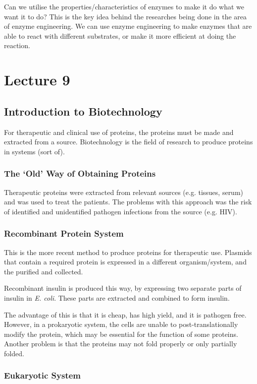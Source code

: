\documentclass[a4paper, 12pt]{report}
\newcommand{\mychapter}[2]{
    \setcounter{chapter}{#1}
    \setcounter{section}{0}
    \chapter*{#2}
    \addcontentsline{toc}{chapter}{#2}
}
\begin{document}
Can we utilise the properties/characteristics of enzymes to make it do what we want it to do?
This is the key idea behind the researches being done in the area of enzyme engineering.
We can use enzyme engineering to make enzymes that are able to react with different substrates, or make it more efficient at doing the reaction.

\mychapter{9}{Lecture 9}

\section{Introduction to Biotechnology}

For therapeutic and clinical use of proteins, the proteins must be made and extracted from a source.
Biotechnology is the field of research to produce proteins in systems (sort of).

\subsection{The `Old' Way of Obtaining Proteins}

Therapeutic proteins were extracted from relevant sources (e.g. tissues, serum) and was used to treat the patients.
The problems with this approach was the risk of identified and unidentified pathogen infections from the source (e.g. HIV).

\subsection{Recombinant Protein System}

This is the more recent method to produce proteins for therapeutic use.
Plasmids that contain a required protein is expressed in a different organism/system, and the purified and collected.

Recombinant insulin is produced this way, by expressing two separate parts of insulin in \textit{E. coli}.
These parts are extracted and combined to form insulin.

The advantage of this is that it is cheap, has high yield, and it is pathogen free.
However, in a prokaryotic system, the cells are unable to post-translationally modify the protein, which may be essential for the function of some proteins.
Another problem is that the proteins may not fold properly or only partially folded.

\subsection{Eukaryotic System}
\end{document}
